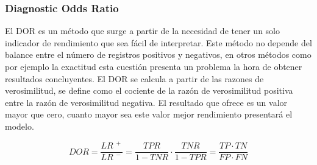 \bigbreak



\subsubsection{Diagnostic Odds Ratio}

El DOR \cite{dor_2003} es un método que surge a partir de la necesidad de tener un solo indicador de rendimiento que sea fácil de interpretar. Este método no depende del balance entre el número de registros positivos y negativos, en otros métodos como por ejemplo la exactitud esta cuestión presenta un problema la hora de obtener resultados concluyentes. El DOR se calcula a partir de las razones de verosimilitud, se define como el cociente de la razón de verosimilitud positiva entre la razón de verosimilitud negativa. El resultado que ofrece es un valor mayor que cero, cuanto mayor sea este valor mejor rendimiento presentará el modelo.

\bigbreak

\begin{equation}
    DOR = \frac{LR^{\phantom{.}+}}{LR^{\phantom{.}-}} = \frac{TPR}{1-TNR} \cdot \frac{TNR}{1-TPR} = \frac{TP \cdot TN}{FP \cdot FN}
    \label{eq:DOR}
\end{equation}

\bigbreak



